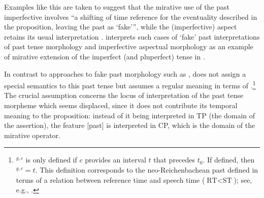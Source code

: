 \documentclass[output=paper,
colorlinks,
citecolor=brown,
newtxmath
]{langscibook}
\begin{document}
\noindent Examples like this are taken to suggest that the mirative use of the past imperfective involves ``a shifting of time reference for the eventuality described in the proposition, leaving the past as `fake'{''}, while the (imperfective) aspect retains its usual interpretation \citep[6]{Bustamante2013}. \citeauthor{Bustamante2013} interprets such cases of `fake' past interpretations of past tense morphology and imperfective aspectual morphology as an example of mirative extension of the imperfect (and pluperfect) tense in .
%
%

In contrast to approaches to fake past morphology such as \citet{Iatridou2000}, \citeauthor{Bustamante2013} does not assign a special semantics to this past tense but assumes a regular meaning in terms of \citet[10]{Kratzer1998}.\footnote{$^{g,c}$ is only defined if $c$ provides an interval $t$ that precedes $t_0$. If defined, then $^{g,c}=t$. This definition corresponds to the neo-Reichenbachean past defined in terms of a relation between reference time and speech time ($\text{RT}<\text{ST}$); see, e.g., \citet{Klein1994}.}
The crucial assumption concerns the locus of interpretation of the past tense morpheme which seems displaced, since it does not contribute its temporal meaning to the proposition:
instead of it being interpreted in TP (the domain of the assertion), the feature [past] is interpreted in CP, which is the domain of the mirative operator.
\end{document}
